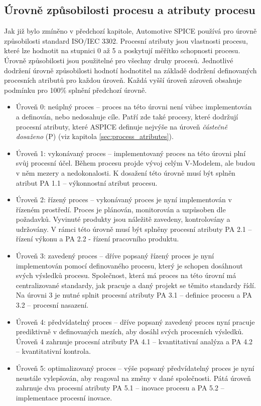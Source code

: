 \documentclass[czech,master]{diploma}
\begin{document}
\subsection{Úrovně způsobilosti procesu a atributy procesu}
Jak již bylo zmíněno v předchozí kapitole, Automotive SPICE používá pro úrovně způsobilosti standard ISO/IEC 3302. Procesní atributy jsou vlastnosti procesu, které lze hodnotit na stupnici 0 až 5 a poskytují měřítko schopnosti procesu. Úrovně způsobilosti jsou použitelné pro všechny druhy procesů. Jednotlivé dodržení úrovně způsobilosti hodnotí hodnotitel na základě dodržení definovaných procesních atributů pro každou úroveň. Každá vyšší úroveň zároveň obsahuje podmínku pro 100\% splnění předchozí úrovně.

\begin{itemize}
\item Úroveň 0: neúplný proces -- proces na této úrovni není vůbec implementován a definován, nebo nedosahuje cíle. Patří zde také procesy, které dodržují procesní atributy, které ASPICE definuje nejvýše na úroveň \textit{částečně dosaženo} (P) (viz kapitola \ref{sec:process_atributes}).

\item Úroveň 1: vykonávaný proces -- implementovaný proces na této úrovni plní svůj procesní účel. Během procesu projde vývoj celým V-Modelem, ale budou v něm mezery a nedokonalosti. K dosažení této úrovně musí být splněn atribut PA 1.1 -- výkonnostní atribut procesu.

\item Úroveň 2: řízený proces -- vykonávaný proces je nyní implementován v řízeném prostředí. Proces je plánován, monitorován a uzpůsoben dle požadavků. Vyvinuté produkty jsou náležitě zavedeny, kontrolovány a udržovány. V rámci této úrovně musí být splněny procesní atributy PA 2.1 -- řízení výkonu a PA 2.2 - řízení pracovního produktu.

\item Úroveň 3: zavedený proces -- dříve popsaný řízený proces je nyní implementován pomocí definovaného procesu, který je schopen dosáhnout svých výsledků procesu. Společnost, která má proces na této úrovní má centralizované standardy, jak pracuje a daný projekt se těmito standardy řídí. Na úrovni 3 je nutné splnit procesní atributy PA 3.1 -- definice procesu a PA 3.2 -- procesní nasazení.

\item Úroveň 4: předvídatelný proces -- dříve popsaný zavedený proces nyní pracuje prediktivně v definovaných mezích, aby dosáhl svých procesních výsledků. Úroveň 4 zahrnuje procesní atributy PA 4.1 -- kvantitativní analýza a PA 4.2 -- kvantitativní kontrola.

\item Úroveň 5: optimalizovaný proces -- výše popsaný předvídatelný proces je nyní neustále vylepšován, aby reagoval na změny v dané společnosti. Pátá úroveň zahrnuje dva procesní atributy PA 5.1 -- inovace procesu a PA 5.2 -- implementace procesní inovace.

\end{itemize}
\end{document}
